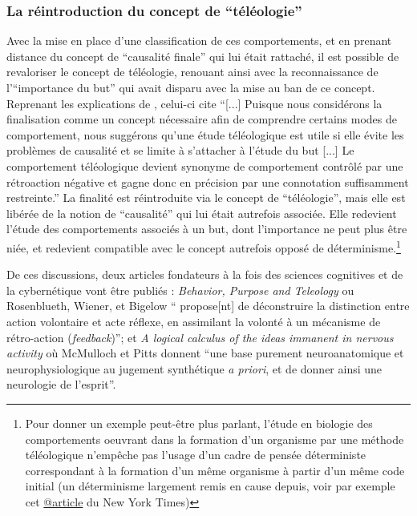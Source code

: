 
\subsubsection{La réintroduction du concept de \enquote{téléologie}}

Avec la mise en place d'une classification de ces comportements, et en prenant distance du concept de \enquote{causalité finale} qui lui était rattaché, il est possible de revaloriser le concept de téléologie, renouant ainsi avec la reconnaissance de l'\enquote{importance du but} qui avait disparu avec la mise au ban de ce concept. Reprenant les explications de \autocite[776]{Pouvreau2013}, celui-ci cite \autocite[23-24]{Rosenblueth1943} \enquote{[...] Puisque nous considérons la finalisation comme un concept nécessaire afin de comprendre certains modes de comportement, nous suggérons qu'une étude téléologique est utile si elle évite les problèmes de causalité et se limite à s'attacher à l'étude du but [...] Le comportement téléologique devient synonyme de comportement contrôlé par une rétroaction négative et gagne donc en précision par une connotation suffisamment restreinte.} La finalité est réintroduite via le concept de \enquote{téléologie}, mais elle est libérée de la notion de \enquote{causalité} qui lui était autrefois associée. Elle redevient l'étude des comportements associés à un but, dont l'importance ne peut plus être niée, et redevient compatible avec le concept autrefois opposé de déterminisme.\footnote{Pour donner un exemple peut-être plus parlant, l'étude en biologie des comportements oeuvrant dans la formation d'un organisme par une méthode téléologique n'empêche pas l'usage d'un cadre de pensée déterministe  correspondant à la formation d'un même organisme à partir d'un même code initial (un déterminisme largement remis en cause depuis, voir par exemple cet \href{http://www.nytimes.com/2014/01/21/science/seeing-x-chromosomes-in-a-new-light.html?ref=science&_r=0}{@article} du New York Times)}

De ces discussions, deux articles fondateurs à la fois des sciences cognitives \autocite[23]{Dupuy2000} et de la cybernétique vont être publiés : \textit{Behavior, Purpose and Teleology} ou Rosenblueth, Wiener, et Bigelow \enquote{ propose[nt] de déconstruire la distinction entre action volontaire et acte réflexe, en assimilant la volonté à un mécanisme de rétro-action (\textit{feedback})}; et \textit{A logical calculus of the ideas immanent in nervous activity} où McMulloch et Pitts donnent \enquote{une base purement neuroanatomique et neurophysiologique au jugement synthétique \textit{a priori}, et de donner ainsi une neurologie de l'esprit}.

